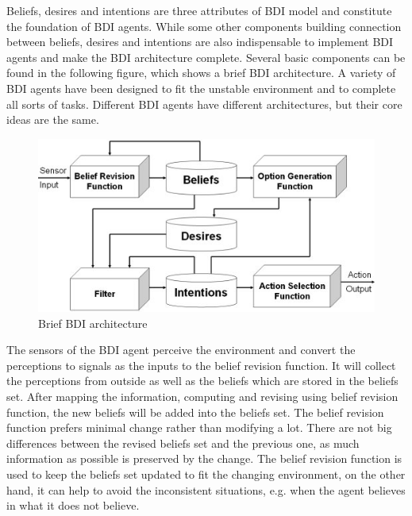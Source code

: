 Beliefs, desires and intentions are three attributes of BDI model and constitute the foundation of BDI agents. While some other components building connection between beliefs, desires and intentions are also indispensable to implement BDI agents and make the BDI architecture complete.
Several basic components can be found in the following figure, which shows a brief BDI architecture. A variety of BDI agents have been designed to fit the unstable environment and to complete all sorts of tasks. Different BDI agents have different architectures, but their core ideas are the same.

\begin{figure}[htbp]
  \centering
  \includegraphics[width=\textwidth]{images/BDIAr}
  \caption{Brief BDI architecture \cite{BDIA}}%
  \label{fig:Brief BDI architecture}
\end{figure}

The sensors of the BDI agent perceive the environment and convert the perceptions to signals as the inputs to the belief revision function. It will collect the perceptions from outside as well as the beliefs which are stored in the beliefs set. After mapping the information, computing and revising using belief revision function, the new beliefs will be added into the beliefs set. The belief revision function prefers minimal change rather than modifying a lot. There are not big differences between the revised beliefs set and the previous one, as much information as possible is preserved by the change\cite{Antje_SpatialBelief_2011}. The belief revision function is used to keep the beliefs set updated to fit the changing environment, on the other hand, it can help to avoid the inconsistent situations, e.g. when the agent believes in what it does not believe.

